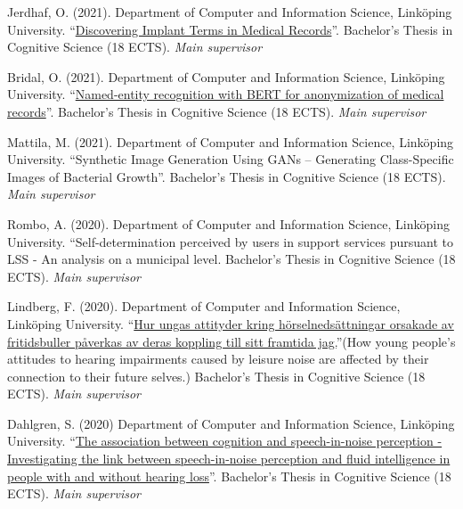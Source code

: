 \documentclass[]{article}
\begin{document}
Jerdhaf, O. (2021). Department of Computer and Information Science,
Linköping University.
``\href{http://liu.diva-portal.org/smash/record.jsf?dswid=-6296&pid=diva2\%3A1621364&c=1&searchType=SIMPLE&language=sv&query=Jerdhaf&af=\%5B\%5D&aq=\%5B\%5B\%5D\%5D&aq2=\%5B\%5B\%5D\%5D&aqe=\%5B\%5D&noOfRows=50&sortOrder=author_sort_asc&sortOrder2=title_sort_asc&onlyFullText=false&sf=undergraduate}{Discovering
Implant Terms in Medical Records}''. Bachelor's Thesis in Cognitive
Science (18 ECTS). \emph{Main supervisor}

Bridal, O. (2021). Department of Computer and Information Science,
Linköping University.
``\href{http://liu.diva-portal.org/smash/record.jsf?dswid=-6296&faces-redirect=true&language=en&searchType=SIMPLE&query=Marsja&af=\%5B\%5D&aq=\%5B\%5B\%5D\%5D&aq2=\%5B\%5B\%5D\%5D&aqe=\%5B\%5D&pid=diva2\%3A1566701&noOfRows=50&sortOrder=author_sort_asc&sortOrder2=title_sort_asc&onlyFullText=false&sf=undergraduate}{Named-entity
recognition with BERT for anonymization of medical records}''.
Bachelor's Thesis in Cognitive Science (18 ECTS). \emph{Main supervisor}

Mattila, M. (2021). Department of Computer and Information Science,
Linköping University. ``Synthetic Image Generation Using GANs --
Generating Class-Specific Images of Bacterial Growth''. Bachelor's
Thesis in Cognitive Science (18 ECTS). \emph{Main supervisor}

Rombo, A. (2020). Department of Computer and Information Science,
Linköping University. ``Self-determination perceived by users in support
services pursuant to LSS - An analysis on a municipal level. Bachelor's
Thesis in Cognitive Science (18 ECTS). \emph{Main supervisor}

Lindberg, F. (2020). Department of Computer and Information Science,
Linköping University.
``\href{http://liu.diva-portal.org/smash/record.jsf?dswid=-6296&faces-redirect=true&language=en&searchType=SIMPLE&query=Marsja&af=\%5B\%5D&aq=\%5B\%5B\%5D\%5D&aq2=\%5B\%5B\%5D\%5D&aqe=\%5B\%5D&pid=diva2\%3A1468019&noOfRows=50&sortOrder=author_sort_asc&sortOrder2=title_sort_asc&onlyFullText=false&sf=undergraduate}{Hur
ungas attityder kring hörselnedsättningar orsakade av fritidsbuller
påverkas av deras koppling till sitt framtida jag.}''(How young people's
attitudes to hearing impairments caused by leisure noise are affected by
their connection to their future selves.) Bachelor's Thesis in Cognitive
Science (18 ECTS). \emph{Main supervisor}

Dahlgren, S. (2020) Department of Computer and Information Science,
Linköping University.
``\href{http://liu.diva-portal.org/smash/record.jsf?dswid=-6296&faces-redirect=true&language=en&searchType=SIMPLE&query=Marsja&af=\%5B\%5D&aq=\%5B\%5B\%5D\%5D&aq2=\%5B\%5B\%5D\%5D&aqe=\%5B\%5D&pid=diva2\%3A1443600&noOfRows=50&sortOrder=author_sort_asc&sortOrder2=title_sort_asc&onlyFullText=false&sf=undergraduate}{The
association between cognition and speech-in-noise perception -
Investigating the link between speech-in-noise perception and fluid
intelligence in people with and without hearing loss}''. Bachelor's
Thesis in Cognitive Science (18 ECTS). \emph{Main supervisor}
\end{document}
